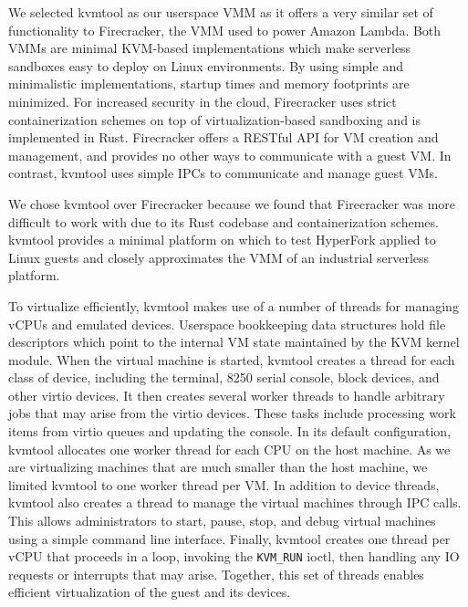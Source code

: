 We selected kvmtool as our userspace VMM as it offers a very similar set of
functionality to Firecracker, the VMM used to power Amazon Lambda. Both VMMs
are minimal KVM-based implementations which make serverless sandboxes easy to
deploy on Linux environments. By using simple and minimalistic implementations,
startup times and memory footprints are minimized. For increased security in
the cloud, Firecracker uses strict containerization schemes on top of
virtualization-based sandboxing and is implemented in Rust. Firecracker offers
a RESTful API for VM creation and management, and provides no other ways to
communicate with a guest VM. In contrast, kvmtool uses simple IPCs to
communicate and manage guest VMs.

We chose kvmtool over Firecracker because we found that Firecracker was more
difficult to work with due to its Rust codebase and containerization schemes.
kvmtool provides a minimal platform on which to test HyperFork applied to Linux
guests and closely approximates the VMM of an industrial serverless platform.

To virtualize efficiently, kvmtool makes use of a number of threads for
managing vCPUs and emulated devices. Userspace bookkeeping data structures hold
file descriptors which point to the internal VM state maintained by the KVM
kernel module. When the virtual machine is started, kvmtool creates a thread
for each class of device, including the terminal, 8250 serial console, block
devices, and other virtio devices. It then creates several worker threads to
handle arbitrary jobs that may arise from the virtio devices. These tasks
include processing work items from virtio queues and updating the console. In
its default configuration, kvmtool allocates one worker thread for each CPU on
the host machine. As we are virtualizing machines that are much smaller than
the host machine, we limited kvmtool to one worker thread per VM. In addition
to device threads, kvmtool also creates a thread to manage the virtual machines
through IPC calls. This allows administrators to start, pause, stop, and debug
virtual machines using a simple command line interface. Finally, kvmtool
creates one thread per vCPU that proceeds in a loop, invoking the
\texttt{KVM\_RUN} ioctl, then handling any IO requests or interrupts that may
arise. Together, this set of threads enables efficient virtualization of the
guest and its devices.
